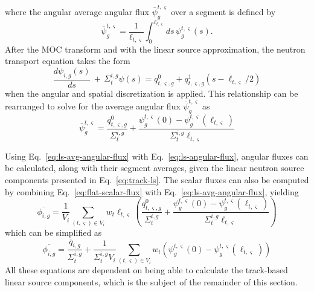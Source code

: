 where the angular average angular flux $\overline{\psi}^{t,\varsigma}_g$ over a segment is defined by
\begin{equation}
\overline{\psi}^{t,\varsigma}_g = \frac{1}{\ell_{t,\varsigma}}\int_{0}^{\ell_{t,\varsigma}} ds \, \psi^{t,\varsigma}_g(s).
\end{equation}
After the MOC transform and with the linear source approximation, the neutron transport equation takes the form
\begin{equation}
	\frac{d\psi_{i,g}(s)}{ds} \, + \, \Sigma_{t}^{i,g} \psi(s) = q^0_{t,\varsigma,g} + q^1_{t,\varsigma,g}(s-\ell_{t,\varsigma}/2)
\end{equation}
when the angular and spatial discretization is applied. This relationship can be rearranged to solve for the average angular flux $\overline{\psi}^{t,\varsigma}_g$ as
\begin{equation}
\overline{\psi}^{t,\varsigma}_g = \frac{q^0_{t,\varsigma,g}}{\Sigma_{t}^{i,g}} + \frac{\psi^{t,\varsigma}_g(0) - \psi^{t,\varsigma}_g(\ell_{t,\varsigma})}{\Sigma_{t}^{i,g} \ell_{t,\varsigma}}
\label{eq:ls-avg-angular-flux}
\end{equation}

Using Eq.~\ref{eq:ls-avg-angular-flux} with Eq.~\ref{eq:ls-angular-flux}, angular fluxes can be calculated, along with their segment averages, given the linear neutron source components presented in Eq.~\ref{eq:track-ls}. The scalar fluxes can also be computed by combining Eq.~\ref{eq:flat-scalar-flux} with Eq.~\ref{eq:ls-avg-angular-flux}, yielding
\begin{equation}
\overline{\phi_{i,g}} = \frac{1}{V_i} \sum_{(t,\varsigma) \in V_i} w_t \ell_{t,\varsigma} \left( \frac{q^0_{t,\varsigma,g}}{\Sigma_{t}^{i,g}} + \frac{\psi^{t,\varsigma}_g(0) - \psi^{t,\varsigma}_g(\ell_{t,\varsigma})}{\Sigma_{t}^{i,g} \ell_{t,\varsigma}} \right)
\end{equation}
which can be simplified as
\begin{equation}
\overline{\phi_{i,g}} = \frac{\overline{q}_{i,g}}{\Sigma_{t}^{i,g}} + \frac{1}{\Sigma_{t}^{i,g} V_i} \sum_{(t,\varsigma) \in V_i} w_t \left(\psi^{t,\varsigma}_g(0) - \psi^{t,\varsigma}_g(\ell_{t,\varsigma}) \right)
\label{eq:ls-avg-scalar-flux}
\end{equation}
All these equations are dependent on being able to calculate the track-based linear source components, which is the subject of the remainder of this section.

